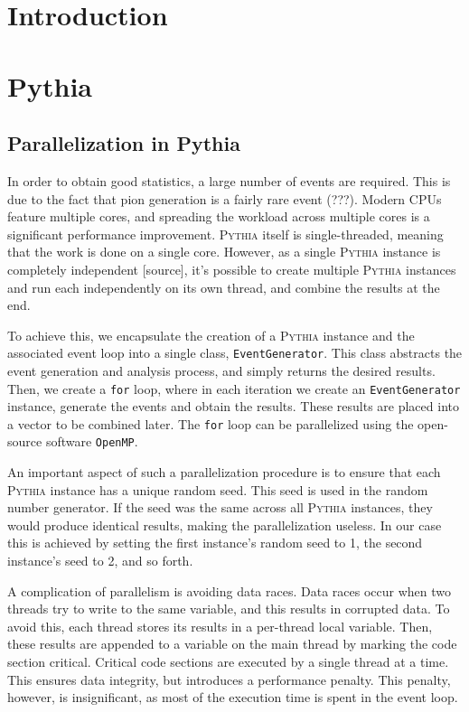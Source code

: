 \documentclass[final]{thesis} %
\newcommand{\pythia}{\textsc{Pythia }}
\begin{document}
\section{Introduction}
\label{sec:introduction}

\section{Pythia}

\subsection{Parallelization in Pythia}

In order to obtain good statistics, a large number of events are required. This is due to the fact that pion generation is a fairly rare event (???). Modern CPUs feature multiple cores, and spreading the workload across multiple cores is a significant performance improvement. \pythia itself is single-threaded, meaning that the work is done on a single core. However, as a single \pythia instance is completely independent [source], it's possible to create multiple \pythia instances and run each independently on its own thread, and combine the results at the end. 

To achieve this, we encapsulate the creation of a \pythia instance and the associated event loop into a single class, \verb#EventGenerator#. This class abstracts the event generation and analysis process, and simply returns the desired results. Then, we create a \verb#for# loop, where in each iteration we create an \verb#EventGenerator# instance, generate the events and obtain the results. These results are placed into a vector to be combined later. The \verb#for# loop can be parallelized using the open-source software \verb#OpenMP#. 

An important aspect of such a parallelization procedure is to ensure that each \pythia instance has a unique random seed. This seed is used in the random number generator. If the seed was the same across all \pythia instances, they would produce identical results, making the parallelization useless. In our case this is achieved by setting the first instance's random seed to 1, the second instance's seed to 2, and so forth.

A complication of parallelism is avoiding data races. Data races occur when two threads try to write to the same variable, and this results in corrupted data. To avoid this, each thread stores its results in a per-thread local variable. Then, these results are appended to a variable on the main thread by marking the code section critical. Critical code sections are executed by a single thread at a time. This ensures data integrity, but introduces a performance penalty. This penalty, however, is insignificant, as most of the execution time is spent in the event loop.
\end{document}
